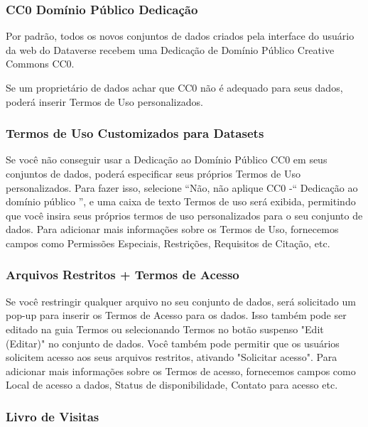 \documentclass[12pt,hidelinks]{article}
\begin{document}
        \subsubsection{CC0 Domínio Público Dedicação}
        
\qquad Por padrão, todos os novos conjuntos de dados criados pela interface do usuário da web do Dataverse recebem uma Dedicação de Domínio Público Creative Commons CC0.

Se um proprietário de dados achar que CC0 não é adequado para seus dados, poderá inserir Termos de Uso personalizados.
    
        \subsubsection{Termos de Uso Customizados para Datasets}
        
\qquad Se você não conseguir usar a Dedicação ao Domínio Público CC0 em seus conjuntos de dados, poderá especificar seus próprios Termos de Uso personalizados. Para fazer isso, selecione “Não, não aplique CC0 -“ Dedicação ao domínio público ”, e uma caixa de texto Termos de uso será exibida, permitindo que você insira seus próprios termos de uso personalizados para o seu conjunto de dados. Para adicionar mais informações sobre os Termos de Uso, fornecemos campos como Permissões Especiais, Restrições, Requisitos de Citação, etc.
        
        \subsubsection{Arquivos Restritos + Termos de Acesso}
        
\qquad Se você restringir qualquer arquivo no seu conjunto de dados, será solicitado um pop-up para inserir os Termos de Acesso para os dados. Isso também pode ser editado na guia Termos ou selecionando Termos no botão suspenso "Edit (Editar)" no conjunto de dados. Você também pode permitir que os usuários solicitem acesso aos seus arquivos restritos, ativando "Solicitar acesso". Para adicionar mais informações sobre os Termos de acesso, fornecemos campos como Local de acesso a dados, Status de disponibilidade, Contato para acesso etc.
        
        \subsubsection{Livro de Visitas}
        
\end{document}

